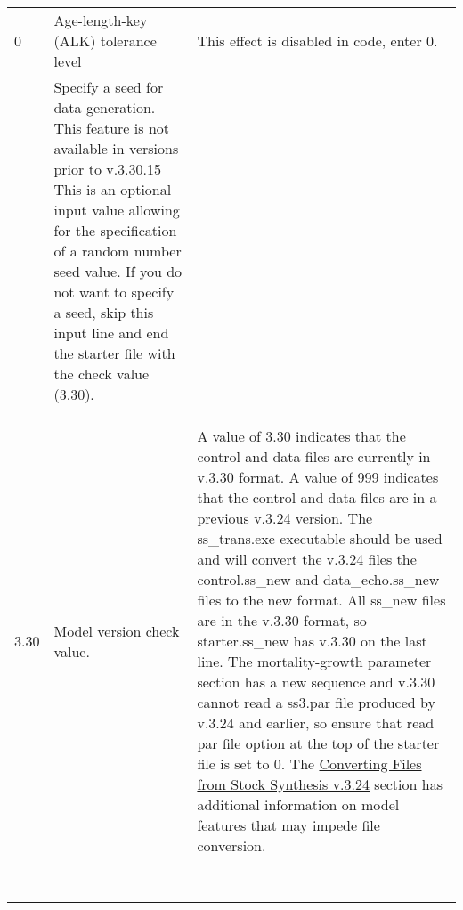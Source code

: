 {\begin{landscape}
\begin{longtable}{p{1.5cm} p{7.2cm} p{12.3cm}}
  \hline
  \hypertarget{ALK}{0} & Age-length-key (ALK) tolerance level & This effect is disabled in code, enter 0. \Tstrut\Bstrut\\

  \pagebreak
  \multicolumn{2}{l}{COND: Seed Value (i.e., 1234)}& \multirow{1}{1cm}[-0.25cm]{\parbox{12.5cm}{Specify a seed for data generation. This feature is not available in versions prior to v.3.30.15 This is an optional input value allowing for the specification of a random number seed value. If you do not want to specify a seed, skip this input line and end the starter file with the check value (3.30).}} \Tstrut\Bstrut\\
  & & \\ 
  & & \Bstrut\\
  & & \\
  
 \hline
 \hypertarget{Convert}{3.30} & Model version check value. & \multirow{1}{1cm}[-0.25cm]{\parbox{12.5cm}{A value of 3.30 indicates that the control and data files are currently in v.3.30 format. A value of 999 indicates that the control and data files are in a previous v.3.24 version. The ss\_trans.exe executable should be used and will convert the v.3.24 files the control.ss\_new and data\_echo.ss\_new files to the new format. All ss\_new files are in the v.3.30 format, so starter.ss\_new has v.3.30 on the last line. The mortality-growth parameter section has a new sequence and v.3.30 cannot read a ss3.par file produced by v.3.24 and earlier, so ensure that read par file option at the top of the starter file is set to 0. The \hyperlink{ConvIssues}{Converting Files from Stock Synthesis v.3.24} section has additional information on model features that may impede file conversion.}} \Tstrut\Bstrut\\
     & & \\  
     & & \\  
	   & & \\
     & & \\
   	 & & \\
     & & \\  
     & & \\  
     & & \\

\end{longtable}
\end{landscape}
}
\restoregeometry





\pagebreak

